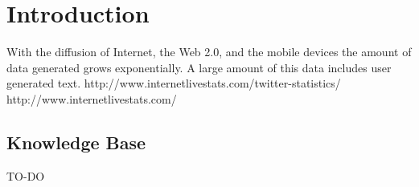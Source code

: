 \chapter{Introduction}

With the diffusion of Internet, the Web 2.0, and the mobile devices the amount of data generated grows exponentially. A large amount of this data includes user generated text. http://www.internetlivestats.com/twitter-statistics/  http://www.internetlivestats.com/

\section{Knowledge Base}
TO-DO